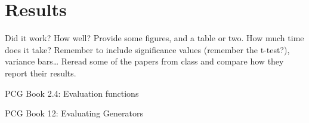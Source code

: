 \section{Results}
\label{05}

Did it work? How well? Provide some figures, and a table or two. How much time does it take? Remember to include significance values (remember the t-test?), variance bars… Reread some of the papers from class and compare how they report their results.

PCG Book 2.4: Evaluation functions

PCG Book 12: Evaluating Generators
